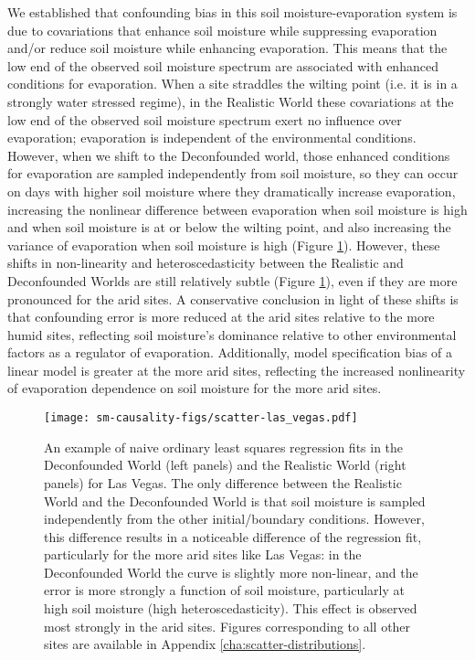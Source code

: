 We established that confounding bias in this soil moisture-evaporation
system is due to covariations that enhance soil moisture while
suppressing evaporation and/or reduce soil moisture while enhancing
evaporation. This means that the low end of the observed soil moisture
spectrum are associated with enhanced conditions for evaporation. When
a site straddles the wilting point (i.e. it is in a strongly water
stressed regime), in the Realistic World these covariations at the low
end of the observed soil moisture spectrum exert no influence over
evaporation; evaporation is independent of the environmental
conditions.  However, when we shift to the Deconfounded world, those
enhanced conditions for evaporation are sampled independently from
soil moisture, so they can occur on days with higher soil moisture
where they dramatically increase evaporation, increasing the nonlinear
difference between evaporation when soil moisture is high and when
soil moisture is at or below the wilting point, and also increasing
the variance of evaporation when soil moisture is high (Figure
\ref{fig:scatter-example}). However, these shifts in non-linearity and
heteroscedasticity between the Realistic and Deconfounded Worlds are
still relatively subtle (Figure \ref{fig:scatter-example}), even if
they are more pronounced for the arid sites. A conservative conclusion
in light of these shifts is that confounding error is more reduced at
the arid sites relative to the more humid sites, reflecting soil
moisture's dominance relative to other environmental factors as a
regulator of evaporation. Additionally, model specification bias of a
linear model is greater at the more arid sites, reflecting the
increased nonlinearity of evaporation dependence on soil moisture for
the more arid sites.

\begin{figure}
  \texttt{[image: sm-causality-figs/scatter-las\_vegas.pdf]}
  \caption{An example of naive ordinary least squares regression fits
    in the Deconfounded World (left panels) and the Realistic World
    (right panels) for Las Vegas. The only difference between the
    Realistic World and the Deconfounded World is that soil moisture
    is sampled independently from the other initial/boundary
    conditions. However, this difference results in a noticeable
    difference of the regression fit, particularly for the more arid
    sites like Las Vegas: in the Deconfounded World the curve is
    slightly more non-linear, and the error is more strongly a
    function of soil moisture, particularly at high soil moisture
    (high heteroscedasticity). This effect is observed most strongly
    in the arid sites. Figures corresponding to all other sites are
    available in Appendix \ref{cha:scatter-distributions}.}
  \label{fig:scatter-example}
\end{figure}

